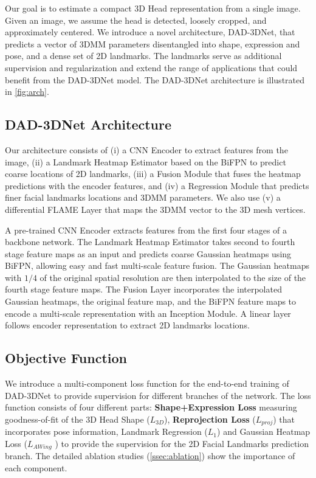 \documentclass[10pt,twocolumn,letterpaper]{article}
\begin{document}
Our goal is to estimate a compact 3D Head representation from a single image. Given an image, we assume the head is detected, loosely cropped, and approximately centered. We introduce a novel architecture, DAD-3DNet, that predicts a vector of 3DMM parameters disentangled into shape, expression and pose, and a dense set of 2D landmarks.
The landmarks serve as additional supervision and regularization and extend the range of applications that could benefit from the DAD-3DNet model. The DAD-3DNet architecture is illustrated in \cref{fig:arch}.

\subsection{DAD-3DNet Architecture}

Our architecture consists of (i) a CNN Encoder to extract features from the image, (ii) a Landmark Heatmap Estimator based on the BiFPN \cite{EfficientDet} to predict coarse locations of 2D landmarks, (iii) a Fusion Module that fuses the heatmap predictions with the encoder features, and (iv) a Regression Module that predicts finer facial landmarks locations and 3DMM parameters. 
We also use (v) a differential FLAME Layer that maps the 3DMM vector to the 3D mesh vertices. 

A pre-trained CNN Encoder extracts features from the first four stages of a backbone network. 
The Landmark Heatmap Estimator takes second to fourth stage feature maps as an input and predicts coarse Gaussian heatmaps using BiFPN, allowing easy and fast multi-scale feature fusion. The Gaussian heatmaps with $1/4$ of the original spatial resolution are then interpolated to the size of the fourth stage feature maps. 
The Fusion Layer incorporates the interpolated Gaussian heatmaps, the original feature map, and the BiFPN feature maps to encode a multi-scale representation with an Inception Module. 
A linear layer follows encoder representation to extract 2D landmarks locations. 

\subsection{Objective Function}\label{ssec:loss}

We introduce a multi-component loss function for the end-to-end training of DAD-3DNet to provide supervision for different branches of the network. The loss function consists of four different parts: \textbf{Shape+Expression Loss} measuring goodness-of-fit of the 3D Head Shape ($L_{3D}$), \textbf{Reprojection Loss} ($L_{proj}$) that incorporates pose information, Landmark Regression ($L_1$) and Gaussian Heatmap Loss ($L_{AWing}$ \cite{AWingLoss}) to provide the supervision for the 2D Facial Landmarks prediction branch. The detailed ablation studies (\cref{ssec:ablation}) show the importance of each component.
\end{document}

